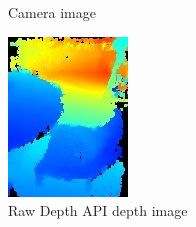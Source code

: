 \begin{figure}[ht!]
\begin{subfigure}[b]{0.4\textwidth}
        \caption{Camera image}
    \end{subfigure}%

    \vspace{0.5em}

    \begin{subfigure}[b]{0.4\textwidth}
        \centering
        \includegraphics[width=0.8\linewidth]{images/depth_raw-depth-image}
        \caption{Raw Depth API depth image}
    \end{subfigure}%
    \begin{subfigure}[b]{0.4\textwidth}
        \centering

\end{subfigure}
\end{figure}
